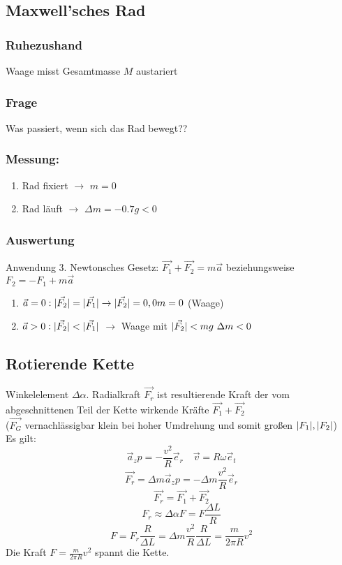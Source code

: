 \documentclass[a4paper]{scrartcl}
\DeclarePairedDelimiter\abs{\lvert}{\rvert}%
\renewcommand{\v}[1]{\vec{#1}}
\begin{document}
\subsection{Maxwell'sches Rad}
\label{sec-8-3}
\subsubsection{Ruhezushand}
\label{sec-8-3-1}
Waage misst Gesamtmasse $M$ austariert
\subsubsection{Frage}
\label{sec-8-3-2}
Was passiert, wenn sich das Rad bewegt??
\subsubsection{Messung:}
\label{sec-8-3-3}
\begin{enumerate}
\item Rad fixiert $\rightarrow$ $m = 0$
\item Rad läuft $\rightarrow$ $\Delta m  = -0.7 g < 0$
\end{enumerate}
\subsubsection{Auswertung}
\label{sec-8-3-4}
Anwendung 3. Newtonsches Gesetz:
$\v{F_1} + \v{F_2} = m\v a$ beziehungsweise $F_2 = - F_1 + m\v a$
\begin{enumerate}
\item $\v a = 0: \abs{\v{F_2}} = \abs{\v{F_1}} \rightarrow \abs{\v{F_2}} = 0, 0 m = 0$ (Waage)
\item $\v a > 0: \abs{\v{F_2}} < \abs{\v{F_1}}$ $\rightarrow$ Waage mit $\abs{\v{F_2}} < m g~\Delta{m} < 0$
\end{enumerate}
\subsection{Rotierende Kette}
\label{sec-8-4}
Winkelelement $\Delta \alpha$. Radialkraft $\v{F_r}$ ist resultierende Kraft der vom abgeschnittenen Teil der Kette wirkende Kräfte $\v{F_1} + \v{F_2}$ \\
   ($\v{F_G}$ vernachlässigbar klein bei hoher Umdrehung und somit großen $\abs{F_1},\abs{F_2}$) \\
   Es gilt:
\[\v a_zp = -\frac{v^2}{R}\v e_r\quad \v v = R\omega \v e_t\]
\[\v{F_r} = \Delta m \v a_zp = -\Delta m \frac{v^2}{R}\v e_r\]
\[\v{F_r} = \v{F_1} + \v{F_2}\]
\[F_r \approx \Delta \alpha F = F\frac{\Delta L}{R}\]
\[F = F_r \frac{R}{\Delta L} = \Delta m \frac{v^2}{R}\frac{R}{\Delta L} = \frac{m}{2\pi R}v^2\]
Die Kraft $F = \frac{m}{2\pi R}v^2$ spannt die Kette.
\end{document}
